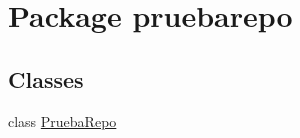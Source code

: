 \hypertarget{namespacepruebarepo}{}\section{Package pruebarepo}
\label{namespacepruebarepo}
\subsection*{Classes}
\begin{DoxyCompactItemize}
\item 
class \mbox{\hyperlink{classpruebarepo_1_1_prueba_repo}{Prueba\+Repo}}
\end{DoxyCompactItemize}
